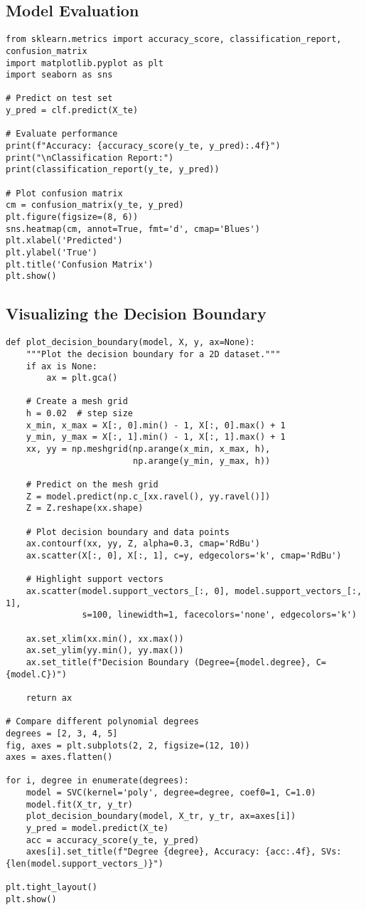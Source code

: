 \documentclass[11pt]{article}
\begin{document}
\subsection{Model Evaluation}
\begin{lstlisting}
from sklearn.metrics import accuracy_score, classification_report, confusion_matrix
import matplotlib.pyplot as plt
import seaborn as sns

# Predict on test set
y_pred = clf.predict(X_te)

# Evaluate performance
print(f"Accuracy: {accuracy_score(y_te, y_pred):.4f}")
print("\nClassification Report:")
print(classification_report(y_te, y_pred))

# Plot confusion matrix
cm = confusion_matrix(y_te, y_pred)
plt.figure(figsize=(8, 6))
sns.heatmap(cm, annot=True, fmt='d', cmap='Blues')
plt.xlabel('Predicted')
plt.ylabel('True')
plt.title('Confusion Matrix')
plt.show()
\end{lstlisting}

\subsection{Visualizing the Decision Boundary}
\begin{lstlisting}
def plot_decision_boundary(model, X, y, ax=None):
    """Plot the decision boundary for a 2D dataset."""
    if ax is None:
        ax = plt.gca()
    
    # Create a mesh grid
    h = 0.02  # step size
    x_min, x_max = X[:, 0].min() - 1, X[:, 0].max() + 1
    y_min, y_max = X[:, 1].min() - 1, X[:, 1].max() + 1
    xx, yy = np.meshgrid(np.arange(x_min, x_max, h),
                         np.arange(y_min, y_max, h))
    
    # Predict on the mesh grid
    Z = model.predict(np.c_[xx.ravel(), yy.ravel()])
    Z = Z.reshape(xx.shape)
    
    # Plot decision boundary and data points
    ax.contourf(xx, yy, Z, alpha=0.3, cmap='RdBu')
    ax.scatter(X[:, 0], X[:, 1], c=y, edgecolors='k', cmap='RdBu')
    
    # Highlight support vectors
    ax.scatter(model.support_vectors_[:, 0], model.support_vectors_[:, 1],
               s=100, linewidth=1, facecolors='none', edgecolors='k')
    
    ax.set_xlim(xx.min(), xx.max())
    ax.set_ylim(yy.min(), yy.max())
    ax.set_title(f"Decision Boundary (Degree={model.degree}, C={model.C})")
    
    return ax

# Compare different polynomial degrees
degrees = [2, 3, 4, 5]
fig, axes = plt.subplots(2, 2, figsize=(12, 10))
axes = axes.flatten()

for i, degree in enumerate(degrees):
    model = SVC(kernel='poly', degree=degree, coef0=1, C=1.0)
    model.fit(X_tr, y_tr)
    plot_decision_boundary(model, X_tr, y_tr, ax=axes[i])
    y_pred = model.predict(X_te)
    acc = accuracy_score(y_te, y_pred)
    axes[i].set_title(f"Degree {degree}, Accuracy: {acc:.4f}, SVs: {len(model.support_vectors_)}")

plt.tight_layout()
plt.show()
\end{lstlisting}
\end{document}
